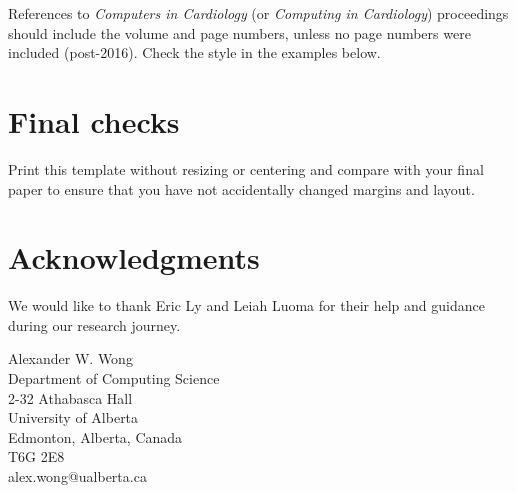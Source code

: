 \documentclass[twocolumn]{cinc}
\begin{document}
References to \emph{Computers in Cardiology} (or \emph{Computing in
  Cardiology}) proceedings should include the volume and page numbers,
unless no page numbers were included (post-2016). Check the style in the
examples below.


\section{ Final checks }     
 
Print this template without resizing or centering and compare with your
final paper to ensure that you have not accidentally changed margins and
layout.


\section*{Acknowledgments}
We would like to thank Eric Ly and Leiah Luoma for their help and guidance during our research journey.



\begin{correspondence}
Alexander W. Wong\\
Department of Computing Science\\
2-32 Athabasca Hall\\
University of Alberta\\
Edmonton, Alberta, Canada\\
T6G 2E8\\
alex.wong@ualberta.ca
\end{correspondence}
\end{document}
